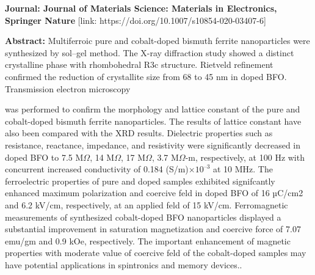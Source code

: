 \documentclass[a4paper,20pt]{article}
\begin{document}
\textbf{Journal: Journal of Materials Science: Materials in Electronics, Springer Nature} [link: https://doi.org/10.1007/s10854-020-03407-6] \\ \vspace{10pt}

\textbf{Abstract:} Multiferroic pure and cobalt-doped bismuth ferrite nanoparticles were synthesized by sol–gel method. The X-ray diffraction study showed a distinct crystalline phase with rhombohedral R3c structure. Rietveld refinement confirmed the reduction of crystallite size from 68 to 45 nm in doped BFO. Transmission electron microscopy \\ \vspace{2pt}

    \begin{minipage}{.59\linewidth} \begin{flushleft}
    
    	  was performed to confirm the morphology and lattice constant of the pure and cobalt-doped bismuth ferrite nanoparticles. The results of lattice constant have also been compared with the XRD results. Dielectric properties such as resistance, reactance, impedance, and resistivity were significantly decreased in doped BFO to 7.5 M$\Omega$, 14 M$\Omega$, 17 M$\Omega$, 3.7 M$\Omega$-m, respectively, at 100 Hz with concurrent increased conductivity of 0.184 (S/m)×${10}^{–3}$ at 10 MHz. The ferroelectric properties of pure and doped samples exhibited signifcantly enhanced maximum polarization and coercive feld in doped BFO of 16 µC/cm2 and 6.2 kV/cm, respectively, at an applied feld of 15 kV/cm. Ferromagnetic measurements of synthesized cobalt-doped BFO nanoparticles displayed a substantial improvement in saturation magnetization and coercive force of 7.07 emu/gm and 0.9 kOe, respectively. The important enhancement of magnetic properties with moderate value of coercive feld of the cobalt-doped samples may have potential applications in spintronics and memory devices.. 
    	\end{flushleft} \end{minipage}
    \hfill 
\end{document}
